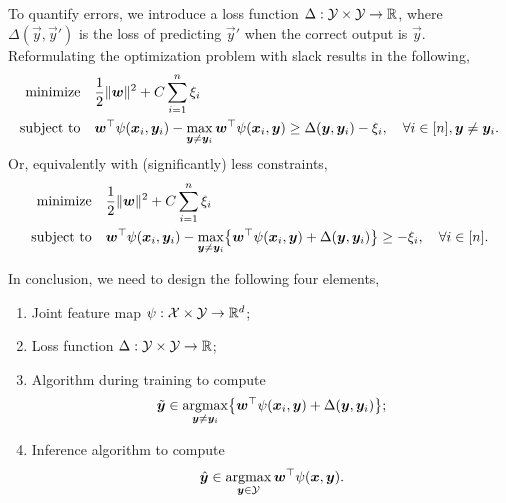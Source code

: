 To quantify errors, we introduce a loss function $\Delta: \mathcal{Y} \times \mathcal{Y} \to \mathbb{R}$,
where $\Delta(\vec{y}, \vec{y}')$ is the loss of predicting $\vec{y}'$ when the correct output is
$\vec{y}$. Reformulating the optimization problem with slack results in the following,
\begin{align*}
    \text{minimize}   & \quad \frac{1}{2} \| \bm{w} \|^2 + C \sum_{i=1}^{n} \xi_i                                                                                                                                  \\
    \text{subject to} & \quad \bm{w}^\top \psi(\bm{x}_i, \bm{y}_i) - \max_{\bm{y} \neq \bm{y}_i} \bm{w}^\top \psi(\bm{x}_i, \bm{y}) \geq \Delta(\bm{y}, \bm{y}_i) - \xi_i, \quad \forall i \in [n], \bm{y} \neq \bm{y}_i.
\end{align*}
Or, equivalently with (significantly) less constraints,
\begin{align*}
    \text{minimize}   & \quad \frac{1}{2} \| \vec{w} \|^2 + C \sum_{i=1}^{n} \xi_i                                                                                                                                  \\
    \text{subject to} & \quad \transpose{\vec{w}} \psi(\vec{x}_i, \vec{y}_i) - \max_{\vec{y} \neq \vec{y}_i} \lft\{ \transpose{\vec{w}} \psi(\vec{x}_i, \vec{y}) + \Delta(\vec{y}, \vec{y}_i) \rgt\} \geq - \xi_i, \quad \forall i \in [n].
\end{align*}

In conclusion, we need to design the following four elements,
\begin{enumerate}
    \item Joint feature map $\psi: \mathcal{X} \times \mathcal{Y} \to \mathbb{R}^d$;
    \item Loss function $\Delta: \mathcal{Y} \times \mathcal{Y} \to \mathbb{R}$;
    \item Algorithm during training to compute \[
            \tilde{\vec{y}} \in \argmax_{\vec{y} \neq \vec{y}_i} \lft\{ \transpose{\vec{w}} \psi(\vec{x}_i, \vec{y}) + \Delta(\vec{y}, \vec{y}_i) \rgt\};
        \]
    \item Inference algorithm to compute \[
            \hat{\bm{y}} \in \operatorname*{argmax}_{\bm{y} \in \mathcal{Y}} \bm{w}^\top \psi(\bm{x}, \bm{y}).
    \]
\end{enumerate}
